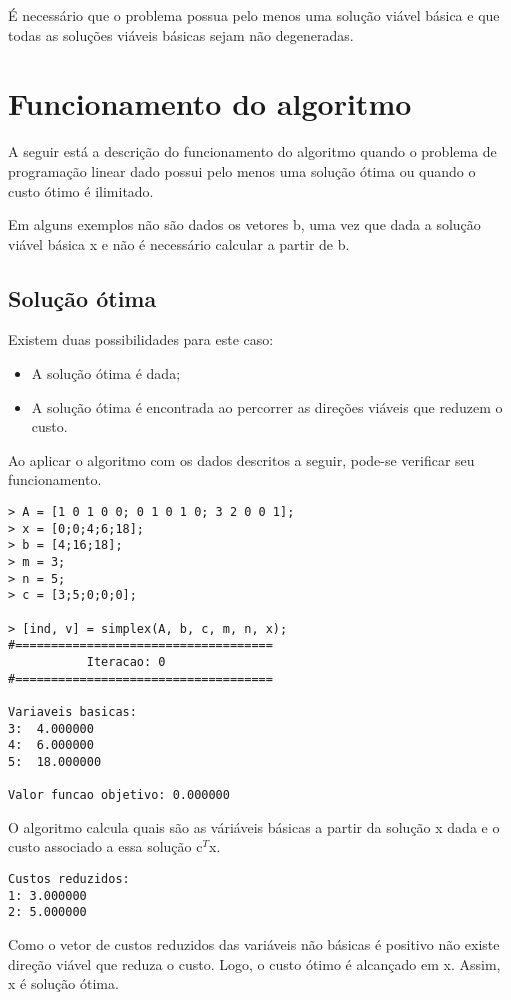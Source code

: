 \documentclass[
	12pt,				%
	openright,			%
	oneside,			%
	a4paper,			%
	english,			%
	french,				%
	spanish,			%
	brazil,				%
	]{abntex2}
\begin{document}
É necessário que o problema possua pelo menos uma solução viável básica e que todas as soluções viáveis básicas sejam não degeneradas.

\chapter{Funcionamento do algoritmo}

A seguir está a descrição do funcionamento do algoritmo quando o problema de
programação linear dado possui pelo menos uma solução ótima ou quando o custo 
ótimo é ilimitado.

Em alguns exemplos não são dados os vetores b, uma vez que dada a solução viável básica x e não é necessário calcular a partir de b.

\section{Solução ótima}

Existem duas possibilidades para este caso: 
\begin{itemize}
\item A solução ótima é dada;
\item A solução ótima é encontrada ao percorrer as direções viáveis que reduzem o custo.
\end{itemize}


Ao aplicar o algoritmo com os dados descritos a seguir, pode-se verificar seu funcionamento.
\begin{verbatim}
> A = [1 0 1 0 0; 0 1 0 1 0; 3 2 0 0 1];
> x = [0;0;4;6;18];
> b = [4;16;18];
> m = 3;
> n = 5;
> c = [3;5;0;0;0];

> [ind, v] = simplex(A, b, c, m, n, x);
#====================================
           Iteracao: 0
#====================================

Variaveis basicas:
3:  4.000000
4:  6.000000
5:  18.000000

Valor funcao objetivo: 0.000000
\end{verbatim}

O algoritmo calcula quais são as váriáveis básicas a partir da solução x dada e o custo associado a essa solução c$^T$x.

\begin{verbatim}
Custos reduzidos:
1: 3.000000
2: 5.000000
\end{verbatim}

Como o vetor de custos reduzidos das variáveis não básicas é positivo não existe direção viável que reduza o custo. Logo, o custo ótimo é alcançado em x. Assim, x é solução ótima.
\end{document}
